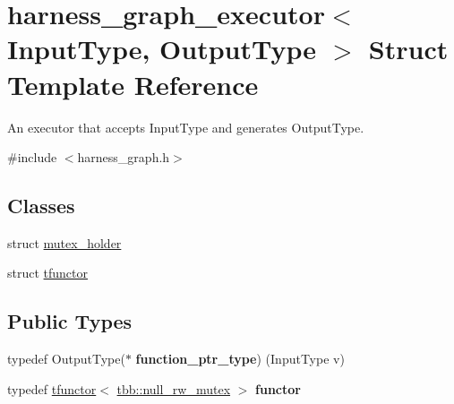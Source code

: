 \hypertarget{structharness__graph__executor}{}\section{harness\+\_\+graph\+\_\+executor$<$ Input\+Type, Output\+Type $>$ Struct Template Reference}
\label{structharness__graph__executor}


An executor that accepts Input\+Type and generates Output\+Type.  




{\ttfamily \#include $<$harness\+\_\+graph.\+h$>$}

\subsection*{Classes}
\begin{DoxyCompactItemize}
\item 
struct \hyperlink{structharness__graph__executor_1_1mutex__holder}{mutex\+\_\+holder}
\item 
struct \hyperlink{structharness__graph__executor_1_1tfunctor}{tfunctor}
\end{DoxyCompactItemize}
\subsection*{Public Types}
\begin{DoxyCompactItemize}
\item 
\hypertarget{structharness__graph__executor_a44175ee5eae11c2d42fbe0169c12b944}{}typedef Output\+Type($\ast$ {\bfseries function\+\_\+ptr\+\_\+type}) (Input\+Type v)\label{structharness__graph__executor_a44175ee5eae11c2d42fbe0169c12b944}

\item 
\hypertarget{structharness__graph__executor_a245b60dd4e566848470f27e5de56461b}{}typedef \hyperlink{structharness__graph__executor_1_1tfunctor}{tfunctor}$<$ \hyperlink{classtbb_1_1null__rw__mutex}{tbb\+::null\+\_\+rw\+\_\+mutex} $>$ {\bfseries functor}\label{structharness__graph__executor_a245b60dd4e566848470f27e5de56461b}

\end{DoxyCompactItemize}
